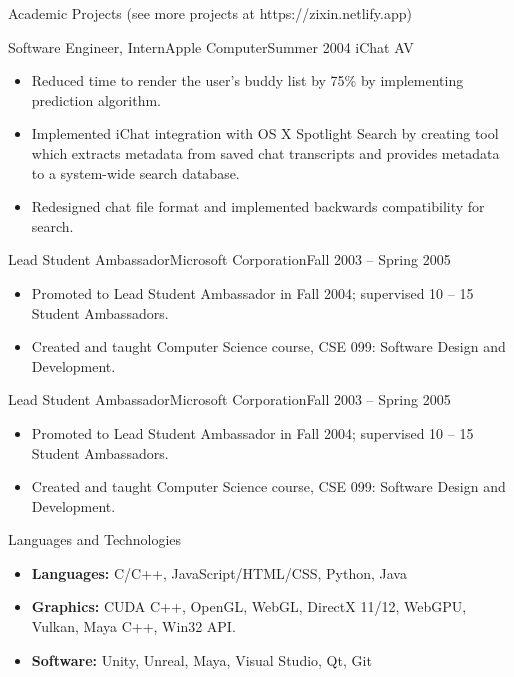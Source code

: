 \documentclass[]{mcdowellcv}
\begin{document}
	\begin{cvsection}{Academic Projects (see more projects at https://zixin.netlify.app)}
		\begin{cvsubsection}{Software Engineer, Intern}{Apple Computer}{Summer 2004}
			iChat AV			
			\begin{itemize}
				\item Reduced time to render the user’s buddy list by 75\% by implementing prediction algorithm.
				\item Implemented iChat integration with OS X Spotlight Search by creating tool which extracts metadata from saved chat transcripts and provides metadata to a system-wide search database.
				\item Redesigned chat file format and implemented backwards compatibility for search.
			\end{itemize}
		\end{cvsubsection}
		
		\begin{cvsubsection}{Lead Student Ambassador}{Microsoft Corporation}{Fall 2003 -- Spring 2005}	
			\begin{itemize}
				\item Promoted to Lead Student Ambassador in Fall 2004; supervised 10 -- 15 Student Ambassadors.
				\item Created and taught Computer Science course, CSE 099: Software Design and Development.
			\end{itemize}
		\end{cvsubsection}

		\begin{cvsubsection}{Lead Student Ambassador}{Microsoft Corporation}{Fall 2003 -- Spring 2005}	
			\begin{itemize}
				\item Promoted to Lead Student Ambassador in Fall 2004; supervised 10 -- 15 Student Ambassadors.
				\item Created and taught Computer Science course, CSE 099: Software Design and Development.
			\end{itemize}
		\end{cvsubsection}
	\end{cvsection}

	\begin{cvsection}{Languages and Technologies}
		\begin{cvsubsection}{}{}{}	
			\begin{itemize}
				\item \textbf{Languages:} C/C++, JavaScript/HTML/CSS, Python, Java
				\item \textbf{Graphics:} CUDA C++, OpenGL, WebGL, DirectX 11/12, WebGPU, Vulkan, Maya C++, Win32 API.
				\item \textbf{Software:} Unity, Unreal, Maya, Visual Studio, Qt, Git 
			\end{itemize}
		\end{cvsubsection}
	\end{cvsection}
	
\end{document}
